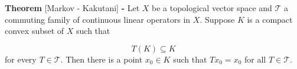 \documentclass[12pt]{article}
\begin{document}
{\bf Theorem} [Markov - Kakutani] {\bf -} Let $X$ be a topological vector space and $\mathcal{T}$ a commuting family of continuous linear operators in $X$. Suppose $K$ is a compact convex subset of $X$ such that

\begin{displaymath}
T(K) \subseteq K
\end{displaymath}
for every $T \in \mathcal{T}$. Then there is a point $x_0 \in K$ such that $Tx_0 = x_0$ for all $T \in \mathcal{T}$. 
\end{document}
